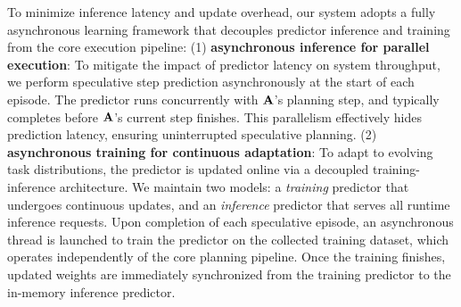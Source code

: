 To minimize inference latency and update overhead, our system adopts a fully asynchronous learning framework that decouples predictor inference and training from the core execution pipeline: (1) \textbf{asynchronous inference for parallel execution}: To mitigate the impact of predictor latency on system throughput, we perform speculative step prediction asynchronously at the start of each episode. The predictor runs concurrently with ${\mathbf{A}}$'s planning step, and typically completes before ${\mathbf{A}}$'s current step finishes. This parallelism effectively hides prediction latency, ensuring uninterrupted speculative planning.
(2) \textbf{asynchronous training for continuous adaptation}: To adapt to evolving task distributions, the predictor is updated online via a decoupled training-inference architecture. We maintain two models: a \emph{training} predictor that undergoes continuous updates, and an \emph{inference} predictor that serves all runtime inference requests. 
Upon completion of each speculative episode, an asynchronous thread is launched to train the predictor on the collected training dataset, which operates independently of the core planning pipeline. Once the training finishes, updated weights are immediately synchronized from the training predictor to the in-memory inference predictor.

